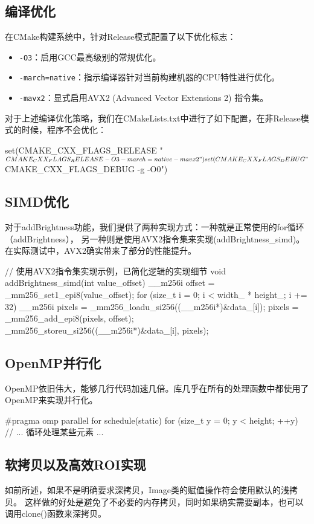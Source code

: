 \documentclass[11pt]{article}
\begin{document}
\subsection{编译优化}
在CMake构建系统中，针对Release模式配置了以下优化标志：
\begin{itemize}
    \item \texttt{-O3}：启用GCC最高级别的常规优化。
    \item \texttt{-march=native}：指示编译器针对当前构建机器的CPU特性进行优化。
    \item \texttt{-mavx2}：显式启用AVX2 (Advanced Vector Extensions 2) 指令集。
\end{itemize}
对于上述编译优化策略，我们在CMakeLists.txt中进行了如下配置，在非Release模式的时候，程序不会优化：
\begin{codeline}
  set(CMAKE_CXX_FLAGS_RELEASE "${CMAKE_CXX_FLAGS_RELEASE} -O3 -march=native -mavx2")
  set(CMAKE_CXX_FLAGS_DEBUG "${CMAKE_CXX_FLAGS_DEBUG} -g -O0")
\end{codeline}

\subsection{SIMD优化}
对于addBrightness功能，我们提供了两种实现方式：一种就是正常使用的for循环（addBrightness），
另一种则是使用AVX2指令集来实现(addBrightness\_simd)。在实际测试中，AVX2确实带来了部分的性能提升。
\begin{codeline}
  // 使用AVX2指令集实现示例，已简化逻辑的实现细节
  void addBrightness_simd(int value_offset) {
      __m256i offset = _mm256_set1_epi8(value_offset);
      for (size_t i = 0; i < width_ * height_; i += 32) {
          __m256i pixels = _mm256_loadu_si256((__m256i*)&data_[i]);
          pixels = _mm256_add_epi8(pixels, offset);
          _mm256_storeu_si256((__m256i*)&data_[i], pixels);
      }
  }
\end{codeline}


\subsection{OpenMP并行化}
OpenMP依旧伟大，能够几行代码加速几倍。库几乎在所有的处理函数中都使用了OpenMP来实现并行化。
\begin{codeline}
#pragma omp parallel for schedule(static)
for (size_t y = 0; y < height; ++y) {
    // ... 循环处理某些元素 ...
}
\end{codeline}

\subsection{软拷贝以及高效ROI实现}
如前所述，如果不是明确要求深拷贝，Image类的赋值操作符会使用默认的浅拷贝。
这样做的好处是避免了不必要的内存拷贝，同时如果确实需要副本，也可以调用clone()函数来深拷贝。
\end{document}
